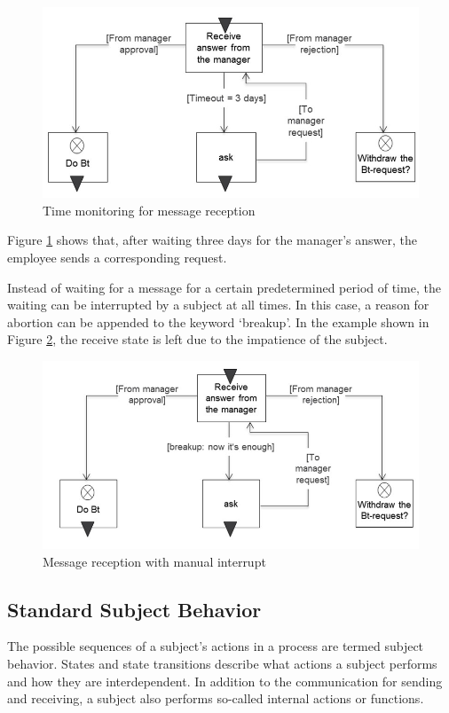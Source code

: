 \begin{figure}[ph]
	\centering
	\includegraphics[width=0.7\linewidth]{20181026-Ontologie-Bilder/Grafiken-Ontologie/SUbjectExecution/ReceiveStateTimer}
	\caption[Time monitoring for message reception]{Time monitoring for message reception}
	\label{fig:receivestatetimer}
\end{figure}

\newpage
Figure \ref{fig:receivestatetimer} shows that, after waiting three days for the manager’s answer, the employee sends a corresponding request.

Instead of waiting for a message for a certain predetermined period of time, the waiting can be interrupted by a subject at all times. In this case, a reason for abortion can be appended to the keyword ‘breakup’. In the example shown in Figure \ref{fig:receivestatebreak}, the receive state is left due to the impatience of the subject.

\begin{figure}[ph]
	\centering
	\includegraphics[width=0.7\linewidth]{20181026-Ontologie-Bilder/Grafiken-Ontologie/SUbjectExecution/ReceiveStateBreak}
	\caption[Message reception with manual interrupt]{Message reception with manual interrupt}
	\label{fig:receivestatebreak}
\end{figure}
\newpage

\subsection{Standard Subject Behavior}
The possible sequences of a subject’s actions in a process are termed subject behavior. States and state transitions describe what actions a subject performs and how they are interdependent. In addition to the communication for sending and receiving, a subject also performs so-called internal actions or functions.

